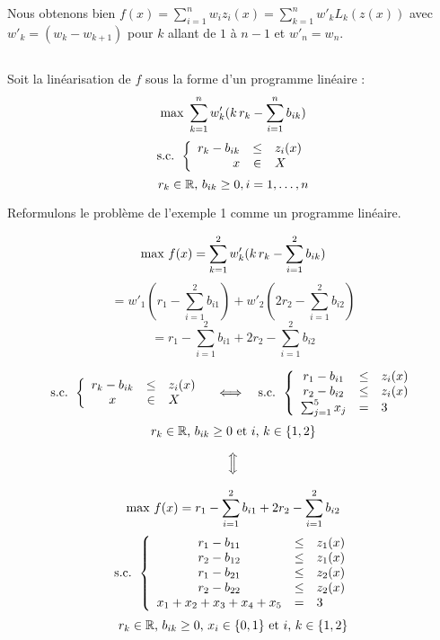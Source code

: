 \documentclass{article}
\begin{document}
Nous obtenons bien $f(x)= \sum_{i=1}^{n}w_iz_i(x) = \sum_{k=1}^{n}w'_{k}L_{k}(z(x))$ avec $w'_k = (w_k - w_{k+1})$ pour $k$ allant de $1$ à $n-1$ et $w'_n = w_n$.

\subsection{} Soit la linéarisation de $f$ sous la forme d'un programme linéaire :
$$\textmd{max }\sum_{k=1}^{n}w'_k(k\,r_k-\sum_{i=1}^{n}b_{ik})$$
$$ \textmd{s.c. }
\left \{
\begin{array}{r c l}
  r_k - b_{ik} & \leq & z_{i}(x) \\
  x & \in & X
\end{array}
\right .
$$
$$r_k \in \mathbb{R}\textmd{, } b_{ik} \geq 0, i=1,\ldots,n$$

Reformulons le problème de l’exemple 1 comme un programme linéaire.

$$\textmd{max }f(x)= \sum_{k=1}^{2}w'_k(k\,r_k-\sum_{i=1}^{2}b_{ik})$$
$$= w'_1(r_1 - \sum_{i=1}^{2}b_{i1}) + w'_2(2r_2 - \sum_{i=1}^{2}b_{i2}) $$
$$= r_1 - \sum_{i=1}^{2}b_{i1} + 2r_2 - \sum_{i=1}^{2}b_{i2}$$

$$ \textmd{s.c. }
\left \{
\begin{array}{c c l}
  r_k - b_{ik} & \leq & z_{i}(x) \\
  x & \in & X
\end{array}
\right .
\quad \Longleftrightarrow \quad \textmd{s.c. }
\left \{
\begin{array}{c c l}
  r_1 - b_{i1} & \leq & z_{i}(x) \\
  r_2 - b_{i2} & \leq & z_{i}(x) \\
  \sum_{j=1}^{5}x_j & = & 3
\end{array}
\right .
$$
$$r_k \in \mathbb{R}\textmd{, } b_{ik} \geq 0 \textmd{ et } i\textmd{, }k\in\{1, 2\}$$

$$\Big\Updownarrow$$

$$\textmd{max }f(x)= r_1 - \sum_{i=1}^{2}b_{i1} + 2r_2 - \sum_{i=1}^{2}b_{i2}$$
$$
\textmd{s.c. }
\left \{
\begin{array}{c c l}
  r_1 - b_{11} & \leq & z_{1}(x) \\
  r_2 - b_{12} & \leq & z_{1}(x) \\
  r_1 - b_{21} & \leq & z_{2}(x) \\
  r_2 - b_{22} & \leq & z_{2}(x) \\
  x_1 + x_2 + x_3 + x_4 + x_5 & = & 3
\end{array}
\right .
$$
$$r_k \in \mathbb{R}\textmd{, }b_{ik} \geq 0\textmd{, }x_i \in \{0,1\} \textmd{ et }i\textmd{, }k\in\{1, 2\}$$
\end{document}
